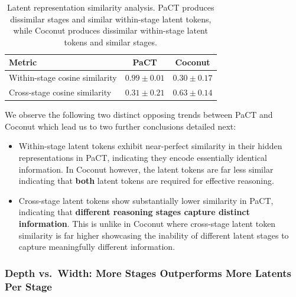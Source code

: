 \begin{table}[H]
\centering
\caption{Latent representation similarity analysis. PaCT produces dissimilar stages and similar within-stage latent tokens, while Coconut produces dissimilar within-stage latent tokens and similar stages.}
\label{tab:latent_similarity}
\small
\begin{tabular}{lcc}
\toprule
{Metric} & {PaCT} & {Coconut} \\
\midrule
Within-stage cosine similarity & $0.99 \pm 0.01$ & $0.30 \pm 0.17$ \\
Cross-stage cosine similarity & $0.31 \pm 0.21$ & $0.63 \pm 0.14$ \\
\bottomrule
\end{tabular}
\end{table}

We observe the following two distinct opposing trends between PaCT and Coconut which lead us to two further conclusions detailed next:
\begin{itemize}
    \item Within-stage latent tokens exhibit near-perfect similarity in their hidden representations in PaCT, indicating they encode essentially identical information. In Coconut however, the latent tokens are far less similar indicating that \textbf{both} latent tokens are required for effective reasoning.
    \item Cross-stage latent tokens show substantially lower similarity in PaCT, indicating that \textbf{different reasoning stages capture distinct information}. This is unlike in Coconut where cross-stage latent token similarity is far higher showcasing the inability of different latent stages to capture meaningfully different information.
\end{itemize}


\subsubsection{Depth vs.\ Width: More Stages Outperforms More Latents Per Stage}


